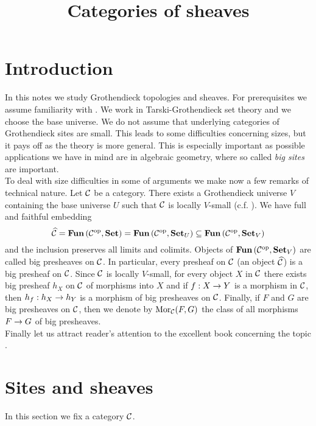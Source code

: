 



\title{Categories of sheaves}
\date{}
\maketitle

\section{Introduction}
\noindent
In this notes we study Grothendieck topologies and sheaves. For prerequisites we assume familiarity with \cite{Presheaves}. We work in Tarski-Grothendieck set theory and we choose the base universe. We do not assume that underlying categories of Grothendieck sites are small. This leads to some difficulties concerning sizes, but it pays off as the theory is more general. This is especially important as possible applications we have in mind are in algebraic geometry, where so called \textit{big sites} are important.\\
To deal with size difficulties in some of arguments we make now a few remarks of technical nature. Let ${\mathcal C}$ be a category. There exists a Grothendieck universe $V$ containing the base universe $U$ such that ${\mathcal C}$ is locally $V$-small (c.f. {\cite[section 1]{Presheaves}}). We have full and faithful embedding
$$\widehat{{\mathcal C}} = \mathbf{Fun}\left({\mathcal C}^{\mathrm{op}},\mathbf{Set}\right) =  \mathbf{Fun}\left({\mathcal C}^{\mathrm{op}},\mathbf{Set}_U\right)\subseteq  \mathbf{Fun}\left({\mathcal C}^{\mathrm{op}},\mathbf{Set}_V\right)$$
and the inclusion preserves all limits and colimits. Objects of $\mathbf{Fun}\left({\mathcal C}^{\mathrm{op}},\mathbf{Set}_V\right)$ are called big presheaves on ${\mathcal C}$. In particular, every presheaf on ${\mathcal C}$ (an object $\widehat{{\mathcal C}}$) is a big presheaf on ${\mathcal C}$. Since ${\mathcal C}$ is locally $V$-small, for every object $X$ in ${\mathcal C}$ there exists big presheaf $h_X$ on ${\mathcal C}$ of morphisms into $X$ and if $f:X\rightarrow Y$ is a morphism in ${\mathcal C}$, then $h_f:h_X\rightarrow h_Y$ is a morphism of big presheaves on ${\mathcal C}$. Finally, if $F$ and $G$ are big presheaves on ${\mathcal C}$, then we denote by $\mathrm{Mor}_{{\mathcal C}}(F,G)$ the class of all morphisms $F\rightarrow G$ of big presheaves.\\
Finally let us attract reader's attention to the excellent book concerning the topic \cite{maclane1994sheaves}.

\section{Sites and sheaves}
\noindent
In this section we fix a category ${\mathcal C}$.

